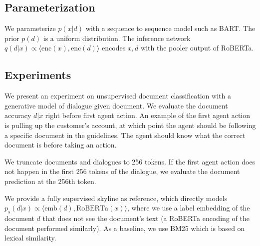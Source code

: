 \documentclass[11pt]{article}
\begin{document}
\subsection{Parameterization}
We parameterize $p(x|d)$ with a sequence to sequence model such as BART.
The prior $p(d)$ is a uniform distribution.
The inference network $q(d|x) \propto \langle\text{enc}(x),\text{enc}(d)\rangle$
encodes $x,d$ with the pooler output of RoBERTa.

\subsection{Experiments}
We present an experiment on
unsupervised document classification with a generative model of dialogue given document.
We evaluate the document accuracy $d|x$ right before first agent action.
An example of the first agent action is pulling up the customer's account,
at which point the agent should be following a specific document in the guidelines.
The agent should know what the correct document is before taking an action.

We truncate documents and dialogues to 256 tokens.
If the first agent action does not happen in the first 256 tokens of the dialogue,
we evaluate the document prediction at the 256th token.

We provide a fully supervised skyline as reference, which directly models
$p_s(d|x) \propto \langle \text{emb}(d), \text{RoBERTa}(x)\rangle$,
where we use a label embedding of the document $d$ that does not see
the document's text (a RoBERTa encoding of the document performed similarly).
As a baseline, we use BM25 which is based on lexical similarity.
\end{document}
